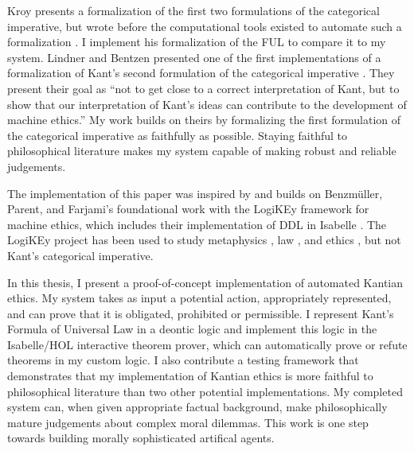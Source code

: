 \begin{isabellebody}
\begin{isamarkuptext}
Kroy presents a formalization of the first two formulations of the categorical imperative, but wrote 
before the computational tools existed to automate such a formalization \citep{kroy}. I implement his formalization of the FUL to compare it to my system. 
Lindner and Bentzen presented one of the first implementations of a formalization of 
Kant's second formulation of the categorical imperative \citep{BL}. They present their goal as ``not to get 
close to a correct interpretation of Kant, but to show that our interpretation of Kant’s ideas can 
contribute to the development of machine ethics.'' My work builds on theirs by formalizing the 
first formulation of the categorical imperative as faithfully as possible. Staying faithful to 
philosophical literature makes my system capable of making robust and reliable judgements. 

The implementation of this paper was inspired by and builds on Benzmüller, Parent, and Farjami's 
foundational work with the LogiKEy framework for machine ethics, which includes their implementation 
of DDL in Isabelle \citep{BFP, logikey}. The LogiKEy project has been used to study metaphysics 
\citep{godel, metaphysics1}, law \citep{constitution}, and ethics \citep{gewirth}, but not 
Kant's categorical imperative.%
\end{isamarkuptext}\isamarkuptrue%
%
\isadelimdocument
%
\endisadelimdocument
%
\isatagdocument
%
\isamarkuptrue%
%
\endisatagdocument
{\isafolddocument}%
%
\isadelimdocument
%
\endisadelimdocument
%
\begin{isamarkuptext}%
In this thesis, I present a proof-of-concept implementation of automated Kantian ethics. My system
takes as input a potential action, appropriately represented, and can prove that it is obligated, 
prohibited or permissible. I represent Kant's Formula of Universal Law in a deontic logic and 
implement this logic in the Isabelle/HOL interactive theorem prover, which can automatically prove or 
refute theorems in my custom logic. I also contribute a testing framework that demonstrates that
my implementation of Kantian ethics is more faithful to philosophical literature than two other 
potential implementations. My completed system can, when given appropriate factual background, make
philosophically mature judgements about complex moral dilemmas. This work is one step towards building 
morally sophisticated artifical agents.


\end{isamarkuptext}
\end{isabellebody}
